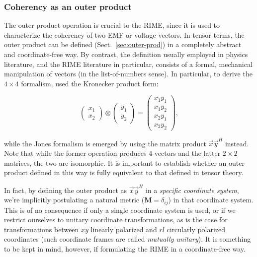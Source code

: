 \documentclass[]{aa}
\newcommand{\herm}{H}
\begin{document}
\subsubsection{Coherency as an outer product}
\label{sec:coh-outer-prod}

The outer product operation is crucial to the RIME, since it is used to characterize the coherency of two EMF or voltage vectors.  In tensor terms, the outer product can be defined (Sect.~\ref{sec:outer-prod}) in a completely abstract and coordinate-free way. By contrast, the definition usually employed in physics literature, and the RIME literature in particular, consists of a formal, mechanical manipulation of vectors (in the list-of-numbers sense). In particular, to derive the $4\times4$ formalism, \citet{ME1} \citep[see also Paper I,][Sect.~6.1]{RRIME1} used the Kronecker product form:

\[
\left( \begin{array}{c}x_1\\x_2\end{array} \right)\otimes
\left( \begin{array}{c}y_1\\y_2\end{array} \right) = 
\left( \begin{array}{c}x_1y_1\\x_1y_2\\x_2y_1\\x_2y_2\end{array} \right),
\]

while the Jones formalism is emerged \citep[Sect.~1]{ME4,RRIME1} by using the matrix product $\vec x \vec y^\herm$ instead. Note that while the former operation produces 4-vectors and the latter $2\times 2$ matrices, the two are isomorphic. It is important to establish whether
an outer product defined in this way is fully equivalent to that defined in tensor theory.

In fact, by defining the outer product as $\vec x \vec y^\herm$ in a \emph{specific coordinate system}, we're implicitly postulating a natural metric ($\mathbf{M}=\delta_{ij}$) in that coordinate system. This is of no consequence if only a single coordinate system is used, or if we restrict ourselves to unitary coordinate transformations, as is the case for transformations between $xy$ linearly polarized and $rl$ circularly polarized coordinates (such coordinate frames are called \emph{mutually unitary\/}). It is something to be kept in mind, however, if formulating the RIME in a coordinate-free way.
\end{document}
